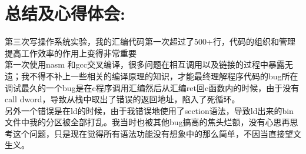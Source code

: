 \documentclass[a4paper,11pt,UTF8]{ctexart}
\begin{document}
\section{总结及心得体会:}

第三次写操作系统实验，我的汇编代码第一次超过了500+行，代码的组织和管理提高工作效率的作用上变得非常重要\\
\indent 第一次使用nasm 和gcc交叉编译，很多问题在相互调用以及链接的过程中暴露无遗；我不得不补上一些相关的编译原理的知识，才能最终理解程序代码的bug所在\\
\indent 调试最久的一个bug是在c程序调用汇编然后从汇编ret回c函数内的时候，由于没有call dword，导致从栈中取出了错误的返回地址，陷入了死循环。\\
\indent 另外一个错误是在ld的时候，由于我错误地使用了section语法，导致ld出来的bin文件中我的分区被全部打乱。我当时也被其他bug搞高的焦头烂额，没有心思再思考这个问题，只是现在觉得所有语法功能没有想象中的那么简单，不因当直接望文生义。\\
\end{document}
